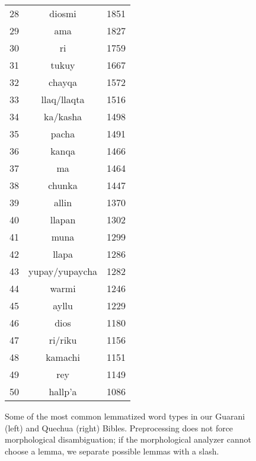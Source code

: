 \begin{figure*}
\begin{tiny}
\begin{centering}
\begin{tabular}{|r|c|c|}
28 & diosmi & 1851 \\
29 & ama & 1827 \\
30 & ri & 1759 \\
31 & tukuy & 1667 \\
32 & chayqa & 1572 \\
33 & llaq/llaqta & 1516 \\
34 & ka/kasha & 1498 \\
35 & pacha & 1491 \\
36 & kanqa & 1466 \\
37 & ma & 1464 \\
38 & chunka & 1447 \\
39 & allin & 1370 \\
40 & llapan & 1302 \\
41 & muna & 1299 \\
42 & llapa & 1286 \\
43 & yupay/yupaycha & 1282 \\
44 & warmi & 1246 \\
45 & ayllu & 1229 \\
46 & dios & 1180 \\
47 & ri/riku & 1156 \\
48 & kamachi & 1151 \\
49 & rey & 1149 \\
50 & hallp'a & 1086 \\
    \hline
  \end{tabular}
  \end{centering}
  \end{tiny}
  \caption{Some of the most common lemmatized word types in our Guarani (left)
  and Quechua (right) Bibles. Preprocessing does not force morphological
  disambiguation; if the morphological analyzer cannot choose a lemma, we
  separate possible lemmas with a slash.}
  \label{fig:mostcommon-gn-qu}
\end{figure*}

